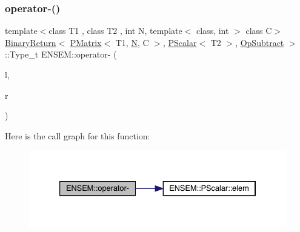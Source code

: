 \mbox{\label{group__primmatrix_gaa44a21f7776bb8fe8502a30e74d88e3f}} 
\subsubsection{\texorpdfstring{operator-\/()}{operator-()}\hspace{0.1cm}{\footnotesize\ttfamily [3/4]}}
{\footnotesize\ttfamily template$<$class T1 , class T2 , int N, template$<$ class, int $>$ class C$>$ \\
\mbox{\hyperlink{structENSEM_1_1BinaryReturn}{Binary\+Return}}$<$ \mbox{\hyperlink{classENSEM_1_1PMatrix}{P\+Matrix}}$<$ T1, \mbox{\hyperlink{operator__name__util_8cc_a7722c8ecbb62d99aee7ce68b1752f337}{N}}, C $>$, \mbox{\hyperlink{classENSEM_1_1PScalar}{P\+Scalar}}$<$ T2 $>$, \mbox{\hyperlink{structENSEM_1_1OpSubtract}{Op\+Subtract}} $>$\+::Type\+\_\+t E\+N\+S\+E\+M\+::operator-\/ (\begin{DoxyParamCaption}\item[{const \mbox{\hyperlink{classENSEM_1_1PMatrix}{P\+Matrix}}$<$ T1, \mbox{\hyperlink{operator__name__util_8cc_a7722c8ecbb62d99aee7ce68b1752f337}{N}}, C $>$ \&}]{l,  }\item[{const \mbox{\hyperlink{classENSEM_1_1PScalar}{P\+Scalar}}$<$ T2 $>$ \&}]{r }\end{DoxyParamCaption})\hspace{0.3cm}{\ttfamily [inline]}}

Here is the call graph for this function\+:\nopagebreak
\begin{figure}[H]
\begin{center}
\leavevmode
\includegraphics[width=333pt]{df/d0a/group__primmatrix_gaa44a21f7776bb8fe8502a30e74d88e3f_cgraph}
\end{center}
\end{figure}
\mbox{\label{group__primmatrix_ga6f60741d61098ca196a5f733f86a5835}} 
